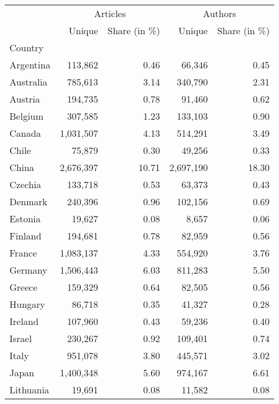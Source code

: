 \begin{tabular}{lrrrr}
\toprule
{} & \multicolumn{2}{c}{Articles} & \multicolumn{2}{c}{Authors} \\
{} &    Unique & Share (in \%) &    Unique & Share (in \%) \\
Country        &           &              &           &              \\
\midrule
Argentina      &   113,862 &         0.46 &    66,346 &         0.45 \\
Australia      &   785,613 &         3.14 &   340,790 &         2.31 \\
Austria        &   194,735 &         0.78 &    91,460 &         0.62 \\
Belgium        &   307,585 &         1.23 &   133,103 &         0.90 \\
Canada         & 1,031,507 &         4.13 &   514,291 &         3.49 \\
Chile          &    75,879 &         0.30 &    49,256 &         0.33 \\
China          & 2,676,397 &        10.71 & 2,697,190 &        18.30 \\
Czechia        &   133,718 &         0.53 &    63,373 &         0.43 \\
Denmark        &   240,396 &         0.96 &   102,156 &         0.69 \\
Estonia        &    19,627 &         0.08 &     8,657 &         0.06 \\
Finland        &   194,681 &         0.78 &    82,959 &         0.56 \\
France         & 1,083,137 &         4.33 &   554,920 &         3.76 \\
Germany        & 1,506,443 &         6.03 &   811,283 &         5.50 \\
Greece         &   159,329 &         0.64 &    82,505 &         0.56 \\
Hungary        &    86,718 &         0.35 &    41,327 &         0.28 \\
Ireland        &   107,960 &         0.43 &    59,236 &         0.40 \\
Israel         &   230,267 &         0.92 &   109,401 &         0.74 \\
Italy          &   951,078 &         3.80 &   445,571 &         3.02 \\
Japan          & 1,400,348 &         5.60 &   974,167 &         6.61 \\
Lithuania      &    19,691 &         0.08 &    11,582 &         0.08 \\

\end{tabular}
